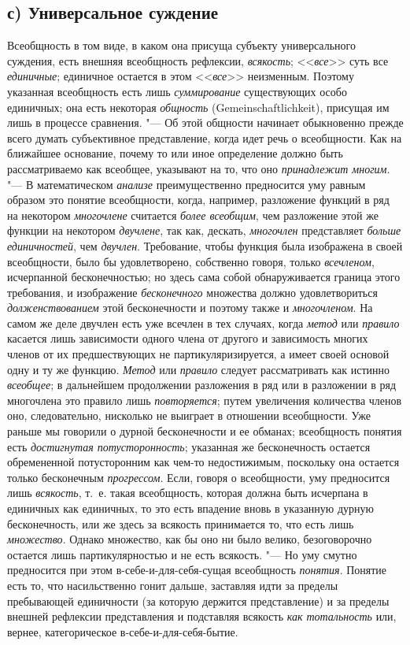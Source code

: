 \subsection[с) Универсальное суждение]{с) Универсальное суждение}
Всеобщность в том виде, в каком она присуща субъекту
универсального суждения, есть внешняя всеобщность рефлексии,
{\em всякость};
<<{\em все}>> суть все
{\em единичные};
единичное остается в этом
<<{\em все}>> неизменным.
Поэтому указанная всеобщность есть лишь
{\em суммирование}
существующих особо единичных; она есть некоторая
{\em общность} (Gemeinschaftlichkeit),
присущая им лишь в процессе сравнения. "--- Об
этой общности начинает обыкновенно прежде всего думать субъективное
представление, когда идет речь о всеобщности. Как на
ближайшее основание, почему то или иное определение должно быть
рассматриваемо как всеобщее, указывают на то, что оно
{\em принадлежит многим}. "---
В математическом
{\em анализе}
преимущественно предносится уму равным образом это понятие
всеобщности, когда, например, разложение функций в ряд на некотором
{\em многочлене}
считается {\em более
всеобщим}, чем разложение этой же функции на некотором
{\em двучлене}, так как,
дескать, {\em многочлен}
представляет {\em больше
единичностей}, чем
{\em двучлен}.
Требование, чтобы функция была изображена в своей
всеобщности, было бы удовлетворено, собственно говоря, только
{\em всечленом},
исчерпанной бесконечностью; но здесь сама собой
обнаруживается граница этого требования, и изображение
{\em бесконечного}
множества должно удовлетвориться
{\em долженствованием}
этой бесконечности и поэтому также и
{\em многочленом}. На
самом же деле двучлен есть уже всечлен в тех случаях, когда
{\em метод} или
{\em правило} касается
лишь зависимости одного члена от другого и зависимость многих членов от их
предшествующих не партикуляризируется, а имеет своей основой одну и ту же
функцию. {\em Метод} или
{\em правило} следует
рассматривать как истинно
{\em всеобщее}; в
дальнейшем продолжении разложения в ряд или в разложении в ряд многочлена
это правило лишь {\em повторяется};
путем увеличения количества членов оно, следовательно,
нисколько не выиграет в отношении всеобщности. Уже раньше мы говорили о
дурной бесконечности и ее обманах; всеобщность понятия есть
{\em достигнутая потусторонность};
указанная же бесконечность остается обремененной
потусторонним как чем-то недостижимым, поскольку она остается только
бесконечным {\em прогрессом}.
Если, говоря о всеобщности, уму предносится лишь
{\em всякость}, т.~е.
такая всеобщность, которая должна быть исчерпана в единичных как единичных,
то это есть впадение вновь в указанную дурную бесконечность, или же здесь
за всякость принимается то, что есть лишь
{\em множество}. Однако
множество, как бы оно ни было велико, безоговорочно остается лишь
партикулярностью и не есть всякость. "--- Но уму смутно
предносится при этом в-себе-и-для-себя-сущая всеобщность
{\em понятия}. Понятие
есть то, что насильственно гонит дальше, заставляя идти за пределы
пребывающей единичности (за которую держится представление) и за пределы
внешней рефлексии представления и подставляя всякость
{\em как тотальность}
или, вернее, категорическое в-себе-и-для-себя-бытие.

